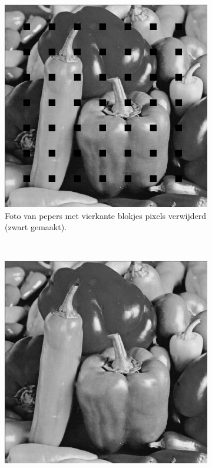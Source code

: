 \begin{figure}
    \centering
    \begin{subfigure}[b]{0.4\textwidth}
        \includegraphics[width=\textwidth]{../src/inpainting/peppers_broke}
        \caption{Foto van pepers met vierkante blokjes pixels verwijderd (zwart gemaakt). }
        \label{fig:matti_fig_1a}
    \end{subfigure}
    ~
    \begin{subfigure}[b]{0.4\textwidth}
        \includegraphics[width=\textwidth]{../src/inpainting/peppers_fixed}

\end{subfigure}
\end{figure}
